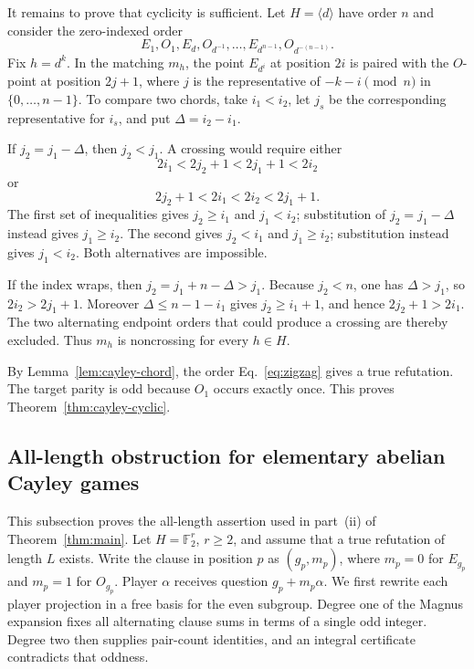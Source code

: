\documentclass[11pt]{article}
\theoremstyle{definition}
\theoremstyle{remark}
\numberwithin{equation}{section}
\begin{document}
It remains to prove that cyclicity is sufficient.  Let
\(H=\langle d\rangle\) have order \(n\) and consider the
zero-indexed order
\begin{equation}\label{eq:zigzag}
  E_1,O_1,E_d,O_{d^{-1}},\ldots,
  E_{d^{n-1}},O_{d^{-(n-1)}}.
\end{equation}
Fix \(h=d^k\).  In the matching \(m_h\), the point \(E_{d^i}\) at position
\(2i\) is paired with the \(O\)-point at position \(2j+1\), where \(j\) is
the representative of \(-k-i\pmod n\) in \(\{0,\ldots,n-1\}\).  To compare
two chords, take \(i_1<i_2\), let \(j_s\) be the corresponding representative
for \(i_s\), and put \(\Delta=i_2-i_1\).

If \(j_2=j_1-\Delta\), then \(j_2<j_1\).  A crossing would require either
\[
  2i_1<2j_2+1<2j_1+1<2i_2
\]
or
\[
  2j_2+1<2i_1<2i_2<2j_1+1.
\]
The first set of inequalities gives \(j_2\geq i_1\) and \(j_1<i_2\);
substitution of \(j_2=j_1-\Delta\) instead gives \(j_1\geq i_2\).
The second gives \(j_2<i_1\) and \(j_1\geq i_2\); substitution instead
gives \(j_1<i_2\).  Both alternatives are impossible.

If the index wraps, then \(j_2=j_1+n-\Delta>j_1\).  Because
\(j_2<n\), one has \(\Delta>j_1\), so \(2i_2>2j_1+1\).
Moreover \(\Delta\leq n-1-i_1\) gives \(j_2\geq i_1+1\), and hence
\(2j_2+1>2i_1\).  The two alternating endpoint orders that could produce a
crossing are thereby excluded.  Thus \(m_h\) is noncrossing for every
\(h\in H\).

By Lemma~\ref{lem:cayley-chord}, the order
Eq.~\eqref{eq:zigzag} gives a true refutation.  The target parity is odd
because \(O_1\) occurs exactly once.  This proves
Theorem~\ref{thm:cayley-cyclic}.

\subsection{All-length obstruction for elementary abelian Cayley games}
\label{sec:magnus}

This subsection proves the all-length assertion used in part~(ii) of
Theorem~\ref{thm:main}.  Let
\(H=\mathbb F_2^r\), \(r\geq2\), and assume that a true refutation of length
\(L\) exists.  Write the clause in position \(p\) as \((g_p,m_p)\), where
\(m_p=0\) for \(E_{g_p}\) and \(m_p=1\) for \(O_{g_p}\).  Player
\(\alpha\) receives question \(g_p+m_p\alpha\).
We first rewrite each player projection in a free basis for the even
subgroup.  Degree one of the Magnus expansion fixes all alternating clause
sums in terms of a single odd integer.  Degree two then supplies pair-count
identities, and an integral certificate contradicts that oddness.
\end{document}
